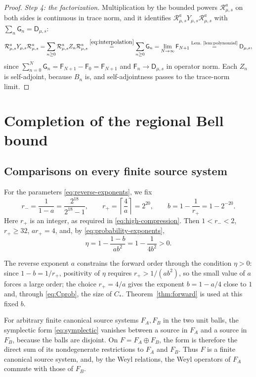 \documentclass[11pt]{amsart}
\numberwithin{equation}{section}
\theoremstyle{definition}
\newcommand{\JointRes}{\mathcal R}
\newcommand{\JointD}{\mathsf D}
\begin{document}
\begin{proof}
\smallskip
\emph{Step 4: the factorization.} Multiplication by the bounded powers
\(\JointRes_{\mu,s}^a\) on both sides is continuous in trace norm, and
it identifies \(\JointRes_{\mu,s}^aY_{\mu,s}\JointRes_{\mu,s}^a\) with
\(\sum_n\mathsf G_n=\JointD_{\mu,s}\):
\[
 \JointRes_{\mu,s}^{a}Y_{\mu,s}\JointRes_{\mu,s}^{a}
 =\sum_{n\ge0}\JointRes_{\mu,s}^{a}Z_n\JointRes_{\mu,s}^{a}
 \overset{\eqref{eq:interpolation}}{=}\sum_{n\ge0}\mathsf G_n
 =\lim_{N\to\infty}\mathsf F_{N+1}
 \overset{\text{Lem.~\ref{lem:polynomial}}}{=}\JointD_{\mu,s},
\]
since \(\sum_{n=0}^N\mathsf G_n=\mathsf F_{N+1}-\mathsf F_0
=\mathsf F_{N+1}\) and \(\mathsf F_n\to\JointD_{\mu,s}\) in operator
norm. Each \(Z_n\) is self-adjoint, because \(B_n\) is, and
self-adjointness passes to the trace-norm limit.
\end{proof}

\section{Completion of the regional Bell bound}\label{sec:completion}

\subsection{Comparisons on every finite source system}

For the parameters \eqref{eq:reverse-exponents}, we fix
\begin{equation}
 r_-=\frac1{1-a}=\frac{2^{18}}{2^{18}-1},\qquad
 r_+=\left\lceil\frac4a\right\rceil=2^{20},\qquad
 b=1-\frac1{r_+}=1-2^{-20}.
 \label{eq:orders}
\end{equation}
Here \(r_+\) is an integer, as required in
\eqref{eq:high-compression}. Then \(1<r_-<2\), \(r_+\ge32\),
\(ar_+=4\), and, by \eqref{eq:probability-exponents},
\[
 \eta=1-\frac{1-b}{ab^2}
 =1-\frac1{4b^2}>0.
\]

The reverse exponent \(a\) constrains the forward order through the
condition \(\eta>0\): since \(1-b=1/r_+\), positivity of \(\eta\)
requires \(r_+>1/(ab^2)\), so the small value of \(a\) forces a large
order; the choice \(r_+=4/a\) gives the exponent \(b=1-a/4\) close to
\(1\) and, through \eqref{eq:Cprob}, the size of \(C_*\).
Theorem~\ref{thm:forward} is used at this fixed \(b\).

For arbitrary finite canonical source systems \(F_A,F_B\) in the two
unit balls, the symplectic form \eqref{eq:symplectic} vanishes between
a source in \(F_A\) and a source in \(F_B\), because the balls are
disjoint. On
\(F=F_A\oplus F_B\), the form is therefore the direct sum of its
nondegenerate restrictions to \(F_A\) and \(F_B\). Thus \(F\) is a finite
canonical source system, and, by the Weyl relations, the Weyl operators
of \(F_A\) commute with those of \(F_B\).
\end{document}
